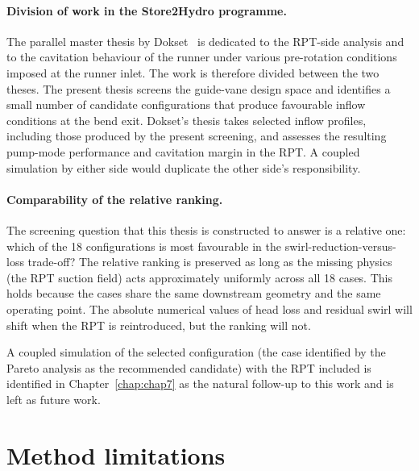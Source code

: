 \paragraph{Division of work in the Store2Hydro programme.} The parallel master thesis by Dokset~\cite{Dokset2025} is dedicated to the RPT-side analysis and to the cavitation behaviour of the runner under various pre-rotation conditions imposed at the runner inlet. The work is therefore divided between the two theses. The present thesis screens the guide-vane design space and identifies a small number of candidate configurations that produce favourable inflow conditions at the bend exit. Dokset's thesis takes selected inflow profiles, including those produced by the present screening, and assesses the resulting pump-mode performance and cavitation margin in the RPT. A coupled simulation by either side would duplicate the other side's responsibility.
 
\paragraph{Comparability of the relative ranking.} The screening question that this thesis is constructed to answer is a relative one: which of the 18 configurations is most favourable in the swirl-reduction-versus-loss trade-off? The relative ranking is preserved as long as the missing physics (the RPT suction field) acts approximately uniformly across all 18 cases. This holds because the cases share the same downstream geometry and the same operating point. The absolute numerical values of head loss and residual swirl will shift when the RPT is reintroduced, but the ranking will not.
 
A coupled simulation of the selected configuration (the case identified by the Pareto analysis as the recommended candidate) with the RPT included is identified in Chapter~\ref{chap:chap7} as the natural follow-up to this work and is left as future work.
 
\section{Method limitations}
\label{sec:methods_limitations_master}
 
